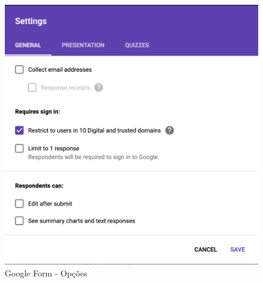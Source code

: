 \begin{figure}[ht!]
	\begin{center}
		\includegraphics[height=.30\textheight]{img/gf/gf-form-set1}
		\caption{Google Form - Opções}
		\label{fig:gf-form-set1}
	\end{center}
\end{figure}

